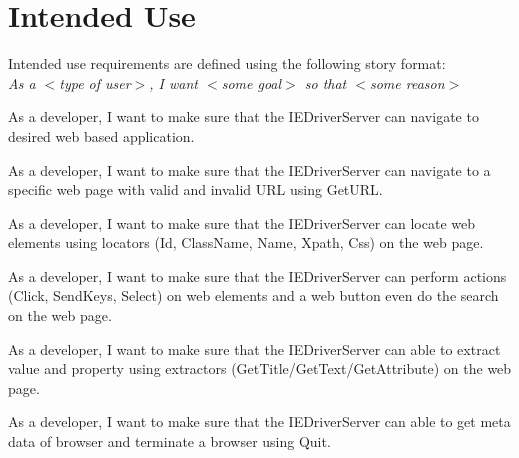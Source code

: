 \clearpage
\section{Intended Use}
\label{sec:iur}

Intended use requirements are defined using the following story format: \\
\hspace*{1.5cm}\emph{As a $<$type of user$>$, I want $<$some goal$>$ so that
$<$some reason$>$}

\begin{description}[leftmargin=5em,style=nextline]

\item[IED-IUR-000] As a developer, I want to make sure that the IEDriverServer can navigate to desired web based application.

\item[IED-IUR-001] As a developer, I want to make sure that the IEDriverServer can navigate to a specific web page with valid and invalid URL using GetURL\@.

\item[IED-IUR-002] As a developer, I want to make sure that the IEDriverServer can locate web elements using locators (Id, ClassName, Name, Xpath, Css) on the web page.
 
\item[IED-IUR-003] As a developer, I want to make sure that the IEDriverServer can perform actions (Click, SendKeys, Select) on web elements and a web button even do the search on the web page.

\item[IED-IUR-004] As a developer, I want to make sure that the IEDriverServer can able to extract value and property using extractors (GetTitle/GetText/GetAttribute) on the web page.

\item[IED-IUR-005] As a developer, I want to make sure that the IEDriverServer can able to get meta data of browser and terminate a browser using Quit.
 
\end{description}